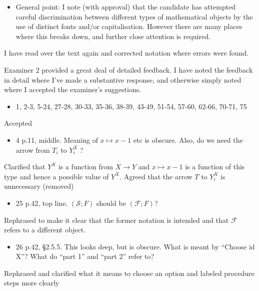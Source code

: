 \documentclass[12pt, a4paper]{article}
\begin{document}
\begin{itemize}
    \item General point: I note (with approval) that the candidate has attempted careful discrimination between different types of mathematical objects by the use of distinct fonts and/or capitalisation. However there are many places where this breaks down, and further close attention is required.
\end{itemize}

I have read over the text again and corrected notation where errors were found.

Examiner 2 provided a great deal of detailed feedback. I have noted the feedback in detail where I've made a substantive response, and otherwise simply noted where I accepted the examiner's suggestions.

\begin{itemize}
    \item 1, 2-3, 5-24, 27-28, 30-33, 35-36, 38-39, 43-49, 51-54, 57-60, 62-66, 70-71, 75
\end{itemize}

Accepted

\begin{itemize}
    \item 4 p.11, middle. Meaning of $x \mapsto x − 1$ etc is obscure. Also, do we need the arrow from $T_i$ to $Y_i^X$ ?
\end{itemize}

Clarified that $Y^X$ is a function from $X\to Y$ and $x\mapsto x-1$ is a function of this type and hence a possible value of $Y^X$. Agreed that the arrow $T$ to $Y^X_i$ is unnecessary (removed)

\begin{itemize}
    \item 25 p.42, top line. $(\mathcal{S}; F)$ should be $(\mathcal{F}; F)$?
\end{itemize}

Rephrased to make it clear that the former notation is intended and that $\mathcal{F}$ refers to a different object.

\begin{itemize}
    \item 26 p.42, §2.5.5. This looks deep, but is obscure. What is meant by ``Choose id X''? What do ``part 1'' and ``part 2'' refer to?
\end{itemize}

Rephrased and clarified what it means to choose an option and labeled procedure steps more clearly
\end{document}
